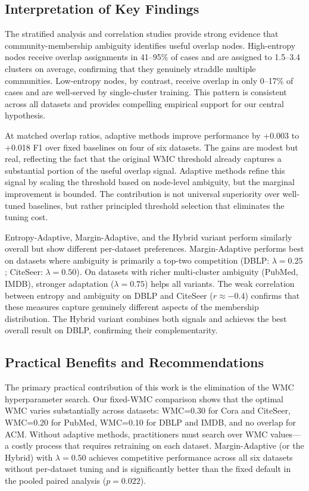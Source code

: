 \documentclass[pdflatex,sn-mathphys-num]{sn-jnl}%
\theoremstyle{thmstyleone}%
\theoremstyle{thmstyletwo}%
\theoremstyle{thmstylethree}%
\begin{document}
\subsection{Interpretation of Key Findings}
\label{subsec:interpretation}

The stratified analysis and correlation studies provide strong evidence that community-membership ambiguity identifies useful overlap nodes. 
High-entropy nodes receive overlap assignments in 41--95\% of cases and are assigned to 1.5--3.4 clusters on average, confirming that they genuinely straddle multiple communities. 
Low-entropy nodes, by contrast, receive overlap in only 0--17\% of cases and are well-served by single-cluster training. 
This pattern is consistent across all datasets and provides compelling empirical support for our central hypothesis.

At matched overlap ratios, adaptive methods improve performance by +0.003 to +0.018 F1 over fixed baselines on four of six datasets. 
The gains are modest but real, reflecting the fact that the original WMC threshold already captures a substantial portion of the useful overlap signal. 
Adaptive methods refine this signal by scaling the threshold based on node-level ambiguity, but the marginal improvement is bounded. 
The contribution is not universal superiority over well-tuned baselines, but rather principled threshold selection that eliminates the tuning cost.

Entropy-Adaptive, Margin-Adaptive, and the Hybrid variant perform similarly overall but show different per-dataset preferences. 
Margin-Adaptive performs best on datasets where ambiguity is primarily a top-two competition (DBLP: $\lambda=0.25$; CiteSeer: $\lambda=0.50$). 
On datasets with richer multi-cluster ambiguity (PubMed, IMDB), stronger adaptation ($\lambda=0.75$) helps all variants. 
The weak correlation between entropy and ambiguity on DBLP and CiteSeer ($r \approx -0.4$) confirms that these measures capture genuinely different aspects of the membership distribution. 
The Hybrid variant combines both signals and achieves the best overall result on DBLP, confirming their complementarity.

\subsection{Practical Benefits and Recommendations}
\label{subsec:practical}

The primary practical contribution of this work is the elimination of the WMC hyperparameter search. 
Our fixed-WMC comparison shows that the optimal WMC varies substantially across datasets: WMC=0.30 for Cora and CiteSeer, WMC=0.20 for PubMed, WMC=0.10 for DBLP and IMDB, and no overlap for ACM. 
Without adaptive methods, practitioners must search over WMC values—a costly process that requires retraining on each dataset. 
Margin-Adaptive (or the Hybrid) with $\lambda = 0.50$ achieves competitive performance across all six datasets without per-dataset tuning and is significantly better than the fixed default in the pooled paired analysis ($p=0.022$).
\end{document}
